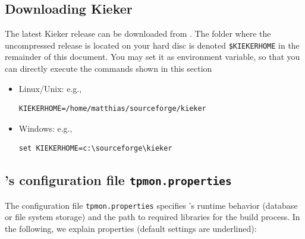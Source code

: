 \documentclass[a4paper,12pt]{scrartcl}
\begin{document}
\subsection{Downloading Kieker}
The latest Kieker release can be downloaded from \kiekerurl{}. The folder where the uncompressed release is located on your hard disc is denoted \texttt{\$KIEKERHOME} in the remainder of this document. You may set it as environment variable, so that you can directly execute the commands shown in this section
\begin{itemize}
 \item Linux/Unix: e.g.,
\begin{lstlisting}[caption={}]
KIEKERHOME=/home/matthias/sourceforge/kieker
\end{lstlisting}
\item Windows: e.g.,
\begin{lstlisting}[caption={}]
set KIEKERHOME=c:\sourceforge\kieker
\end{lstlisting}
\end{itemize}

\subsection{\tpmon{}'s configuration file \texttt{tpmon.properties}}\label{sec.tpmon.properties}




The configuration file \texttt{tpmon.properties} specifies \tpmon{}'s runtime behavior (database or file system
storage) and the path to required libraries for the build process. In the following, we explain properties (default settings are underlined):
\end{document}
